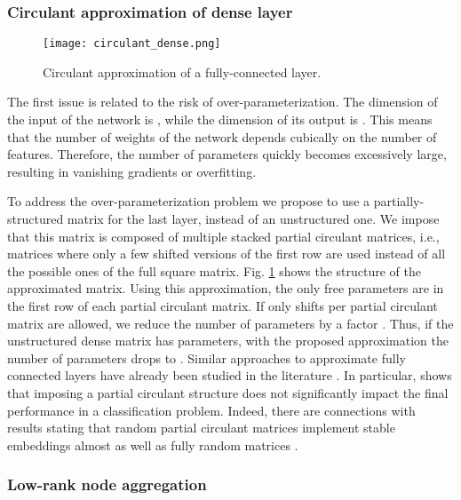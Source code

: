 \documentclass[journal]{IEEEtran}
\begin{document}
\subsubsection{Circulant approximation of dense layer}

\begin{figure}
    \centering
    \texttt{[image: circulant\_dense.png]}
    \caption{Circulant approximation of a fully-connected layer.}
    \label{fig:circ}
\end{figure}

The first issue is related to the risk of over-parameterization. The dimension of the input of the  network is , while the dimension of its output is . This means that the number of weights of the network depends cubically on the number of features. Therefore, the number of parameters quickly becomes excessively large, resulting in vanishing gradients or overfitting. 



To address the over-parameterization problem we propose to use a partially-structured matrix for the last layer, instead of an unstructured one. We impose that this matrix is composed of multiple stacked partial circulant matrices, i.e., matrices where only a few shifted versions of the first row are used instead of all the possible ones of the full square matrix. Fig. \ref{fig:circ} shows the structure of the approximated matrix. Using this approximation, the only free parameters are in the first row of each partial circulant matrix. If only  shifts per partial circulant matrix are allowed, we reduce the number of parameters by a factor . Thus, if the unstructured dense matrix has  parameters, with the proposed approximation the number of parameters drops to  . Similar approaches to approximate fully connected layers have already been studied in the literature \cite{cheng2015exploration,wu2016compression}. In particular, \cite{cheng2015exploration} shows that imposing a partial circulant structure does not significantly impact the final performance in a classification problem. Indeed, there are connections with results stating that random partial circulant matrices implement stable embeddings almost as well as fully random matrices \cite{hinrichs2011johnson,valsesia2017user,valsesia2017binary}.


\subsubsection{Low-rank node aggregation}
\end{document}
